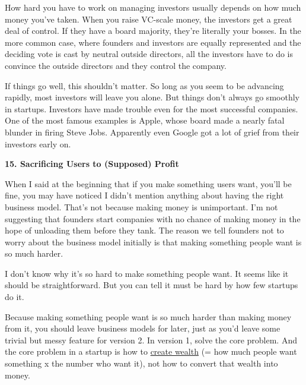 How
                    hard you have to work on managing investors usually depends
                    on how much money you've taken. When you raise VC-scale
                    money, the investors get a great deal of control. If they
                    have a board majority, they're literally your bosses. In the
                    more common case, where founders and investors are equally
                    represented and the deciding vote is cast by neutral outside
                    directors, all the investors have to do is convince the
                    outside directors and they control the company.

If
                    things go well, this shouldn't matter. So long as you seem
                    to be advancing rapidly, most investors will leave you
                    alone. But things don't always go smoothly in startups.
                    Investors have made trouble even for the most successful
                    companies. One of the most famous examples is Apple, whose
                    board made a nearly fatal blunder in firing Steve Jobs.
                    Apparently even Google got a lot of grief from their
                    investors early on.

\textbf{15. Sacrificing Users to (Supposed) Profit}

When I said at the beginning that if you make
                    something users want, you'll be fine, you may have noticed I
                    didn't mention anything about having the right business
                    model. That's not because making money is unimportant. I'm
                    not suggesting that founders start companies with no chance
                    of making money in the hope of unloading them before they
                    tank. The reason we tell founders not to worry about the
                    business model initially is that making something people
                    want is so much harder.

I don't know why it's so
                    hard to make something people want. It seems like it should
                    be straightforward. But you can tell it must be hard by how
                    few startups do it.

Because making something
                    people want is so much harder than making money from it, you
                    should leave business models for later, just as you'd leave
                    some trivial but messy feature for version 2. In version 1,
                    solve the core problem. And the core problem in a startup is
                    how to \href{http://www.paulgraham.com/wealth.html}{create wealth} (= how much
                    people want something x the number who want it), not how to
                    convert that wealth into money.

